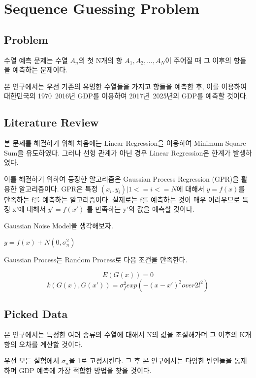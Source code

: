 \documentclass{sig-alternate-05-2015}
\begin{document}
\section{Sequence Guessing Problem}
\begin{CJK}{UTF8}{mj}
\subsection{Problem}
수열 예측 문제는 수열 ${A_n}$의 첫 N개의 항 $A_1, A_2, ..., A_N$이 주어질 때 그 이후의 항들을 예측하는 문제이다.

본 연구에서는 우선 기존의 유명한 수열들을 가지고 항들을 예측한 후, 이를 이용하여 대한민국의 1970~2016년 GDP를 이용하여 2017년~2025년의 GDP를 예측할 것이다.

\subsection{Literature Review}
본 문제를 해결하기 위해 처음에는 Linear Regression을 이용하여 Minimum Square Sum을 유도하였다. 그러나 선형 관계가 아닌 경우 Linear Regression은 한계가 발생하였다.

이를 해결하기 위하여 등장한 알고리즘은 Gaussian Process Regression (GPR)을 활용한 알고리즘이다.
GPR은 특정 ${(x_i,y_i) | 1<=i<=N}$에 대해서 $y = f(x)$를 만족하는 f를 예측하는 알고리즘이다. 실제로는 f를 예측하는 것이 매우 어려우므로 특정 x'에 대해서 $y' = f(x')$ 를 만족하는 y'의 값을 예측할 것이다.

Gaussian Noise Model을 생각해보자.

$y = f(x) + N(0, \sigma_n^2)$

Gaussian Process는 Random Process로 다음 조건을 만족한다.

\begin{equation} E(G(x)) = 0 \end{equation}
\begin{equation} k(G(x),G(x')) = \sigma_f^2 exp({-(x-x')^2} over {2l^2}) \end{equation}

\subsection{Picked Data}
본 연구에서는 특정한 여러 종류의 수열에 대해서 N의 값을 조절해가며 그 이후의 K개 항의 오차를 계산할 것이다.

우선 모든 실험에서 $\sigma_n$을 1로 고정시킨다. 그 후 본 연구에서는 다양한 변인들을 통제하며 GDP 예측에 가장 적합한 방법을 찾을 것이다.


\end{CJK}
\end{document}

